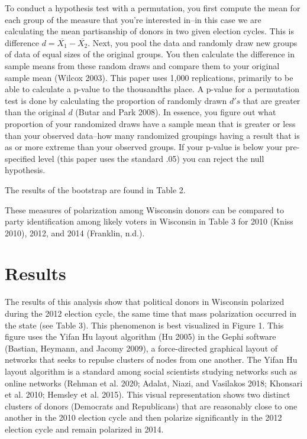 \documentclass[12pt,]{article}
\begin{document}
To conduct a hypothesis test with a permutation, you first compute the
mean for each group of the measure that you're interested in--in this
case we are calculating the mean partisanship of donors in two given
election cycles. This is difference
\(d = \overline{X_{1}}-\overline{X_{2}}\). Next, you pool the data and
randomly draw new groups of data of equal sizes of the original groups.
You then calculate the difference in sample means from these random
draws and compare them to your original sample mean (Wilcox 2003). This
paper uses 1,000 replications, primarily to be able to calculate a
p-value to the thousandths place. A p-value for a permutation test is
done by calculating the proportion of randomly drawn \(d's\) that are
greater than the original \(d\) (Butar and Park 2008). In essence, you
figure out what proportion of your randomized draws have a sample mean
that is greater or less than your observed data--how many randomized
groupings having a result that is as or more extreme than your observed
groups. If your p-value is below your pre-specified level (this paper
uses the standard .05) you can reject the null hypothesis.

The results of the bootstrap are found in Table 2.

These measures of polarization among Wisconsin donors can be compared to
party identification among likely voters in Wisconsin in Table 3 for
2010 (Kniss 2010), 2012, and 2014 (Franklin, n.d.).

\hypertarget{results}{%
\section{Results}\label{results}}

The results of this analysis show that political donors in Wisconsin
polarized during the 2012 election cycle, the same time that mass
polarization occurred in the state (see Table 3). This phenomenon is
best visualized in Figure 1. This figure uses the Yifan Hu layout
algorithm (Hu 2005) in the Gephi software (Bastian, Heymann, and Jacomy
2009), a force-directed graphical layout of networks that seeks to
repulse clusters of nodes from one another. The Yifan Hu layout
algorithm is a standard among social scientists studying networks such
as online networks (Rehman et al. 2020; Adalat, Niazi, and Vasilakos
2018; Khonsari et al. 2010; Hemsley et al. 2015). This visual
representation shows two distinct clusters of donors (Democrats and
Republicans) that are reasonably close to one another in the 2010
election cycle and then polarize significantly in the 2012 election
cycle and remain polarized in 2014.
\end{document}
